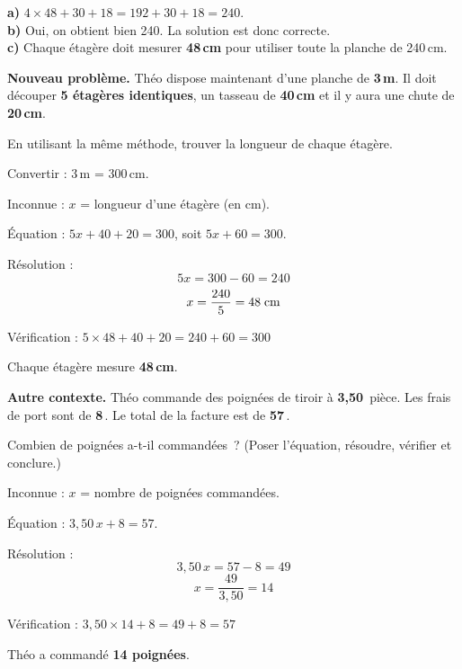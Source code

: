 \documentclass[a4paper,11pt]{article}
\begin{document}
\begin{correction}
\textbf{a)} $4 \times 48 + 30 + 18 = 192 + 30 + 18 = 240$.\\
\textbf{b)} Oui, on obtient bien 240. La solution est donc correcte.\\
\textbf{c)} Chaque étagère doit mesurer \textbf{48\,cm} pour utiliser toute la planche de 240\,cm.
\end{correction}

\vspace{6pt}

\begin{question}
\textbf{Nouveau problème.} Théo dispose maintenant d'une planche de \textbf{3\,m}. Il doit découper \textbf{5 étagères identiques}, un tasseau de \textbf{40\,cm} et il y aura une chute de \textbf{20\,cm}.

\medskip
En utilisant la même méthode, trouver la longueur de chaque étagère.
\end{question}

\begin{correction}
Convertir : 3\,m = 300\,cm.

Inconnue : $x$ = longueur d'une étagère (en cm).

Équation : $5x + 40 + 20 = 300$, soit $5x + 60 = 300$.

Résolution :
\[ 5x = 300 - 60 = 240 \]
\[ x = \frac{240}{5} = 48 \text{\;cm} \]

Vérification : $5 \times 48 + 40 + 20 = 240 + 60 = 300$\;\checkmark

Chaque étagère mesure \textbf{48\,cm}.
\end{correction}

\vspace{6pt}

\begin{question}
\textbf{Autre contexte.} Théo commande des poignées de tiroir à \textbf{3{,}50\,\texteuro{}} pièce. Les frais de port sont de \textbf{8\,\texteuro{}}. Le total de la facture est de \textbf{57\,\texteuro{}}.

\medskip
Combien de poignées a-t-il commandées~? {\small(Poser l'équation, résoudre, vérifier et conclure.)}
\end{question}

\begin{correction}
Inconnue : $x$ = nombre de poignées commandées.

Équation : $3{,}50\,x + 8 = 57$.

Résolution :
\[ 3{,}50\,x = 57 - 8 = 49 \]
\[ x = \frac{49}{3{,}50} = 14 \]

Vérification : $3{,}50 \times 14 + 8 = 49 + 8 = 57$\;\checkmark

Théo a commandé \textbf{14 poignées}.
\end{correction}
\end{document}
